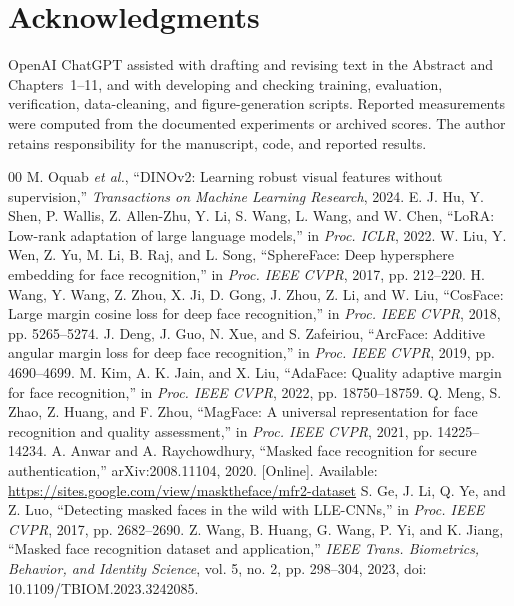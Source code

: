 \documentclass[12pt,a4paper,oneside]{report}
\begin{document}
\chapter*{Acknowledgments}
\noindent\begin{minipage}{\columnwidth}
OpenAI ChatGPT assisted with drafting and revising text in the Abstract and Chapters~1--11, and with developing and checking training, evaluation, verification, data-cleaning, and figure-generation scripts. Reported measurements were computed from the documented experiments or archived scores. The author retains responsibility for the manuscript, code, and reported results.
\end{minipage}
\begin{thebibliography}{00}
 M. Oquab \textit{et al.}, ``DINOv2: Learning robust visual features without supervision,'' \textit{Transactions on Machine Learning Research}, 2024.
 E. J. Hu, Y. Shen, P. Wallis, Z. Allen-Zhu, Y. Li, S. Wang, L. Wang, and W. Chen, ``LoRA: Low-rank adaptation of large language models,'' in \textit{Proc. ICLR}, 2022.
 W. Liu, Y. Wen, Z. Yu, M. Li, B. Raj, and L. Song, ``SphereFace: Deep hypersphere embedding for face recognition,'' in \textit{Proc. IEEE CVPR}, 2017, pp. 212--220.
 H. Wang, Y. Wang, Z. Zhou, X. Ji, D. Gong, J. Zhou, Z. Li, and W. Liu, ``CosFace: Large margin cosine loss for deep face recognition,'' in \textit{Proc. IEEE CVPR}, 2018, pp. 5265--5274.
 J. Deng, J. Guo, N. Xue, and S. Zafeiriou, ``ArcFace: Additive angular margin loss for deep face recognition,'' in \textit{Proc. IEEE CVPR}, 2019, pp. 4690--4699.
 M. Kim, A. K. Jain, and X. Liu, ``AdaFace: Quality adaptive margin for face recognition,'' in \textit{Proc. IEEE CVPR}, 2022, pp. 18750--18759.
 Q. Meng, S. Zhao, Z. Huang, and F. Zhou, ``MagFace: A universal representation for face recognition and quality assessment,'' in \textit{Proc. IEEE CVPR}, 2021, pp. 14225--14234.
 A. Anwar and A. Raychowdhury, ``Masked face recognition for secure authentication,'' arXiv:2008.11104, 2020. [Online]. Available: \url{https://sites.google.com/view/masktheface/mfr2-dataset}
 S. Ge, J. Li, Q. Ye, and Z. Luo, ``Detecting masked faces in the wild with LLE-CNNs,'' in \textit{Proc. IEEE CVPR}, 2017, pp. 2682--2690.
 Z. Wang, B. Huang, G. Wang, P. Yi, and K. Jiang, ``Masked face recognition dataset and application,'' \textit{IEEE Trans. Biometrics, Behavior, and Identity Science}, vol. 5, no. 2, pp. 298--304, 2023, doi: 10.1109/TBIOM.2023.3242085.

\end{thebibliography}
\end{document}
